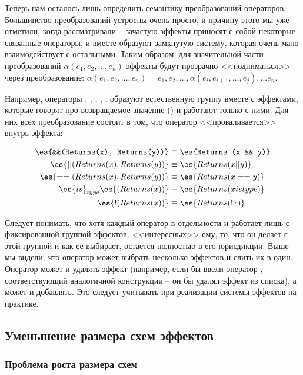 Теперь нам осталось лишь определить семантику преобразований операторов. Большинство преобразований устроены очень просто, и причину этого мы уже отметили, когда рассматривали  -- зачастую эффекты приносят с собой некоторые связанные операторы, и вместе образуют замкнутую систему, которая очень мало взаимодействует с остальными. Таким образом, для значительной части преобразований $\alpha(e_1, e_2, \ldots, e_n)$ эффекты будут прозрачно <<подниматься>> через преобразование: $\alpha(e_1, e_2, \ldots, e_n) = e_1, e_2, \ldots, \alpha(e_i, e_{i + 1}, \ldots, e_j), \ldots e_n$.

Например, операторы \code{\&\&}, \code{||}, \code{==}, , \code{!},  образуют естественную группу вместе с эффектами, которые говорят про возвращаемое значение () и работают только с ними. Для них всех преобразование состоит в том, что оператор <<проваливается>> внутрь эффекта: 

\[
\begin{align*}
	\es{&&(Returns(x), Returns(y))}   & \equiv \es{Returns (x && y)}    \\
	\es{||(Returns(x), Returns(y))}   & \equiv \es{Returns (x || y)}    \\
	\es{==(Returns(x), Returns(y))}   & \equiv \es{Returns (x == y)}    \\
	\es{is}_{type} \es{(Returns(x))}  & \equiv \es{Returns (x is type)} \\
	\es{!(Returns(x))} 				  & \equiv \es{Returns (!x)}
\end{align*}
\]

Следует понимать, что хотя каждый оператор в отдельности и работает лишь с фиксированной группой эффектов, <<интересных>> ему, то, что он делает с этой группой и как ее выбирает, остается полностью в его юрисдикции. Выше мы видели, что оператор может выбрать несколько эффектов и слить их в один. Оператор может и удалять эффект (например, если бы ввели оператор , соответствующий аналогичной конструкции -- он бы удалял эффект  из списка), а может и добавлять. Это следует учитывать при реализации системы эффектов на практике.



\subsection{Уменьшение размера схем эффектов}

\subsubsection{Проблема роста размера схем}

